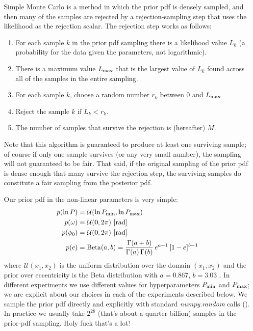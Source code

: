 \documentclass[manuscript, letterpaper]{aastex6}
\newcommand{\project}[1]{\textsl{#1}}
\begin{document}
Simple Monte Carlo is a method in which the prior pdf is densely
sampled, and then many of the samples are rejected by a
rejection-sampling step that uses the likelihood as the rejection
scalar.
The rejection step works as follows:
\begin{enumerate}
\item For each sample $k$ in the prior pdf sampling there is a
  likelihood value $L_k$ (a probability for the data given the
  parameters, not logarithmic).
\item There is a maximum value $L_{\rm max}$ that is the largest value of
  $L_k$ found across all of the samples in the entire sampling.
\item For each sample $k$, choose a random number $r_k$ between 0 and
  $L_{\rm max}$
\item Reject the sample $k$ if $L_k < r_k$.
\item The number of samples that survive the rejection is (hereafter) $M$.
\end{enumerate}
Note that this algorithm is guaranteed to produce at least one
surviving sample; of course if only one sample survives (or any very
small number), the sampling will not guaranteed to be fair.
That said, if the original sampling of the prior pdf is dense enough
that many survive the rejection step, the surviving samples do
constitute a fair sampling from the posterior pdf.

Our prior pdf in the non-linear parameters is very simple:
\begin{align}
    p(\ln P) &= \mathcal{U}(\ln P_{\rm min}, \ln P_{\rm max})\\
    p(\omega) &= \mathcal{U}(0, 2\pi) ~ [{\rm rad}]\\
    p(\phi_0) &= \mathcal{U}(0, 2\pi) ~ [{\rm rad}]\\
    p(e) &= {\rm Beta}(a, b) = \frac{\Gamma(a+b)}{\Gamma(a) \, \Gamma(b)} \, e^{a-1} \, [1 - e]^{b-1}
\end{align}
where $\mathcal{U}(x_1, x_2)$ is the uniform distribution over the
domain $(x_1, x_2)$ and the prior over eccentricity is the Beta
distribution with $a=0.867$, $b=3.03$ \citep{Kipping:2013}.
In different experiments we use different values for hyperparameters
$P_{\rm min}$ and $P_{\rm max}$; we are explicit about our choices in
each of the experiments described below.
We sample the prior pdf directly and explicitly with standard
\project{numpy.random} calls (\citealt{Van-der-Walt:2011}).
In practice we usually take $2^{28}$ (that's about a quarter billion)
samples in the prior-pdf sampling. Holy fuck that's a lot!
\end{document}
